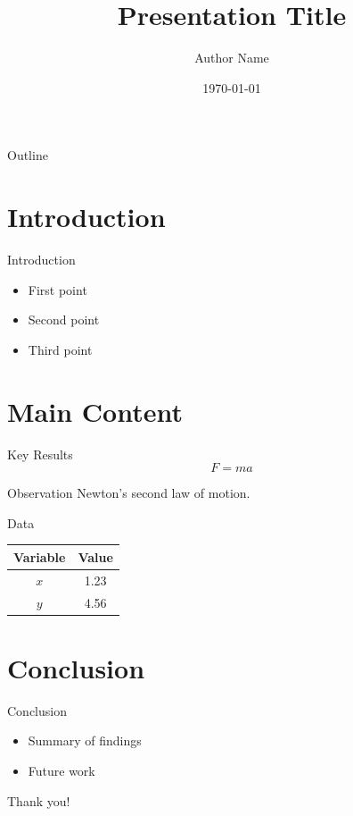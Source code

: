 \documentclass{beamer}
\title{Presentation Title}
\author{Author Name}
\institute{Institution}
\date{\today}
\begin{document}
\begin{frame}
  \titlepage
\end{frame}

\begin{frame}{Outline}
  \tableofcontents
\end{frame}

\section{Introduction}

\begin{frame}{Introduction}
  \begin{itemize}
    \item First point
    \item Second point
    \item Third point
  \end{itemize}
\end{frame}

\section{Main Content}

\begin{frame}{Key Results}
  \begin{equation}
    F = ma
  \end{equation}

  \begin{block}{Observation}
    Newton's second law of motion.
  \end{block}
\end{frame}

\begin{frame}{Data}
  \begin{table}
    \centering
    \begin{tabular}{|c|c|}
      \hline
      Variable & Value \\
      \hline
      $x$ & 1.23 \\
      $y$ & 4.56 \\
      \hline
    \end{tabular}
  \end{table}
\end{frame}

\section{Conclusion}

\begin{frame}{Conclusion}
  \begin{itemize}
    \item Summary of findings
    \item Future work
  \end{itemize}

  \vfill
  \centering
  \Large Thank you!
\end{frame}
\end{document}
